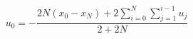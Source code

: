 \documentclass{article}
\begin{document}
\thispagestyle{empty}

$$
u_0 = -\frac{ 2N(x_0-x_N)+  2\sum\limits_{i=0}^N \sum\limits_{j=1}^{i-1}u_j }{2+2N}
$$
\end{document}
